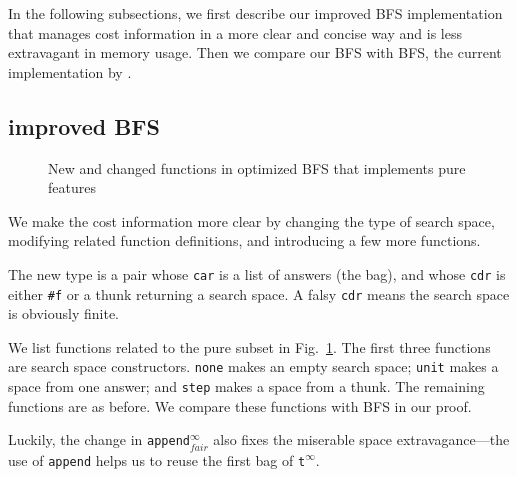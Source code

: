 \documentclass[format=acmlarge, review=true, authordraft=true]{acmart}
\newcommand{\BFS}[0]{BFS}
\newcommand{\BFSser}[0]{BFS}
\begin{document}
In the following subsections, we first describe our improved \BFS{}
implementation that manages cost information in a more clear and concise
way and is less extravagant in memory usage. 
Then we compare our BFS{} with \BFS{}, the 
current implementation by \citeauthor{seres1999algebra}.


\subsection{improved BFS}

\begin{figure}
		
	\caption{New and changed functions in optimized BFS that implements pure 
	features}
	\label{BFSimp}
\end{figure}


We make the cost information more clear by changing the type of search space, 
modifying related function definitions, and introducing a few more functions.

The new type is a pair whose \texttt{car} is a list of answers (the bag), and 
whose \texttt{cdr} is either \texttt{\#{}f} or a thunk returning a search 
space. A falsy \texttt{cdr} means the search space is obviously finite. 

We list functions related to the pure subset in Fig.~\ref{BFSimp}. The first 
three functions are search space constructors. \texttt{none} makes an empty 
search space; \texttt{unit} makes a space from one answer; and \texttt{step} 
makes a space from a thunk. The remaining functions are as before. We compare 
these functions with \BFSser{} in our proof. 

Luckily, the change in \texttt{append$^\infty_{fair}$} also fixes the miserable 
space extravagance---the use of \texttt{append} helps us to reuse the first bag 
of \texttt{t$^\infty$}.
\end{document}
